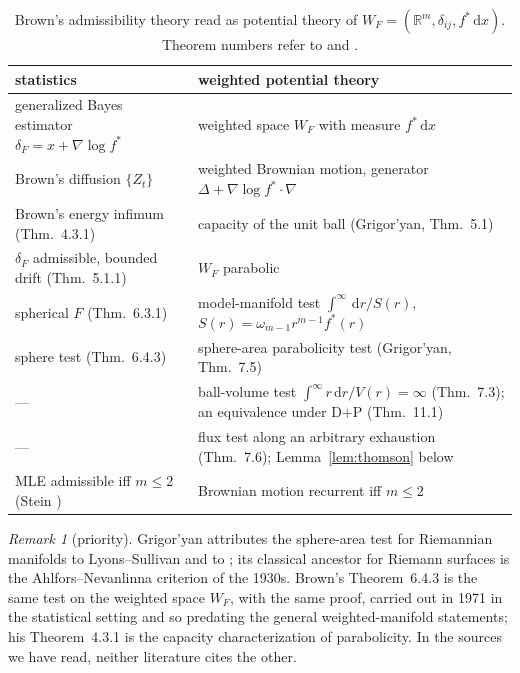 \documentclass[11pt]{amsart}
\newcommand{\R}{\mathbb{R}}
\newcommand{\dd}{\,\mathrm{d}}
\theoremstyle{plain}
\theoremstyle{definition}
\theoremstyle{remark}
\newtheorem{remark}[theorem]{Remark}
\begin{document}
\begin{table}[b]
\caption{Brown's admissibility theory read as potential theory of
$W_F=(\R^m,\delta_{ij},f^*\dd x)$. Theorem numbers refer to \cite{brown1971} and
\cite{grigoryan1999}.}
\label{tab:dict}
\small
\begin{tabular}{@{}>{\raggedright\arraybackslash}p{}>{\raggedright\arraybackslash}p{}@{}}
\toprule
statistics & weighted potential theory \\
\midrule
generalized Bayes estimator $\delta_F=x+\nabla\log f^*$ & weighted space $W_F$ with measure $f^*\dd x$ \\
Brown's diffusion $\{Z_t\}$ & weighted Brownian motion, generator $\Delta+\nabla\log f^*\cdot\nabla$ \\
Brown's energy infimum (Thm.~4.3.1) & capacity of the unit ball (Grigor'yan, Thm.~5.1) \\
$\delta_F$ admissible, bounded drift (Thm.~5.1.1) & $W_F$ parabolic \\
spherical $F$ (Thm.~6.3.1) & model-manifold test $\int^\infty\dd r/S(r)$, $S(r)=\omega_{m-1}r^{m-1}f^*(r)$ \\
sphere test (Thm.~6.4.3) & sphere-area parabolicity test (Grigor'yan, Thm.~7.5) \\
--- & ball-volume test $\int^\infty r\dd r/V(r)=\infty$ (Thm.~7.3); an equivalence under D+P (Thm.~11.1) \\
--- & flux test along an arbitrary exhaustion (Thm.~7.6); Lemma~\ref{lem:thomson} below \\
MLE admissible iff $m\le2$ (Stein \cite{stein1956}) & Brownian motion recurrent iff $m\le2$ \\
\bottomrule
\end{tabular}
\end{table}

\begin{remark}[priority]\label{rem:priority}
Grigor'yan \cite[p.~178]{grigoryan1999} attributes the sphere-area test for
Riemannian manifolds to Lyons--Sullivan \cite{lyonssullivan1984} and to
\cite{grigoryan1985}; its classical ancestor for Riemann surfaces is the
Ahlfors--Nevanlinna criterion of the 1930s. Brown's Theorem~6.4.3 is the same
test on the weighted space $W_F$, with the same proof, carried out in 1971 in
the statistical setting and so predating the general weighted-manifold
statements; his Theorem~4.3.1 is the capacity characterization of parabolicity.
In the sources we have read, neither literature cites the other.
\end{remark}
\end{document}
